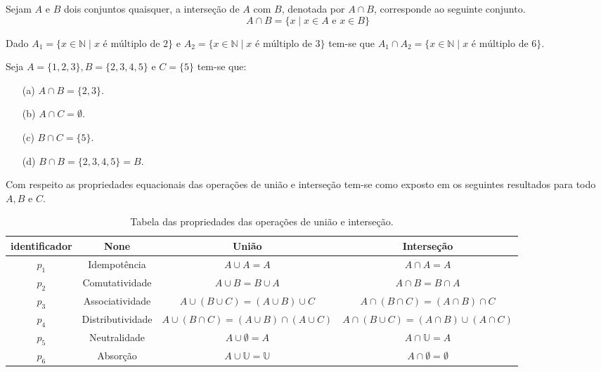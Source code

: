\begin{definition}\label{def:IntersecaoConjuntos}
	Sejam $A$ e $B$ dois conjuntos quaisquer, a interseção de $A$ com $B$, denotada por $A \cap B$, corresponde ao seguinte conjunto.
	$$A \cap B = \{x \mid x \in A \mbox{ e } x \in B\}$$
\end{definition}

\begin{example}\label{exe:IntersecaoDeConuuntos1}
	Dado $A_1 = \{x \in \mathbb{N} \mid x \mbox{ é múltiplo de } 2\}$ e $A_2 = \{x \in \mathbb{N} \mid x \mbox{ é múltiplo de } 3\}$ tem-se que $A_1 \cap A_2 = \{x \in \mathbb{N} \mid x \mbox{ é múltiplo de } 6\}$.
\end{example}

\begin{example}\label{exe:IntersecaoDeConuuntos2}
	Seja $A = \{1, 2, 3\}, B = \{2, 3, 4, 5\}$ e $C = \{5\}$ tem-se que:
	\begin{itemize}
		\item[(a)] $A \cap B = \{2, 3\}$.
		\item[(b)] $A \cap C = \emptyset$.
		\item[(c)] $B \cap C = \{5\}$.
		\item[(d)] $B \cap B = \{2, 3, 4, 5\} = B$.
	\end{itemize}
\end{example}

Com respeito as propriedades equacionais das operações de união e interseção tem-se como exposto em \cite{lipschutz2013-MD} os seguintes resultados para todo $A, B$ e $C$.

\begin{table}[h]
	\centering
	\begin{tabular}{cccc}
		\hline
		identificador & None & União & Interseção  \\
		\hline
		$p_1$ & Idempotência &  $A \cup A = A$ & $A \cap A = A$  \\
		$p_2$ & Comutatividade & $A \cup B = B \cup A$ & $A \cap B = B \cap A$ \\
		$p_3$ & Associatividade & $A \cup (B \cup C) = (A \cup B) \cup C$ & $A \cap (B \cap C) = (A \cap B) \cap C$ \\
		$p_4$ & Distributividade & $A \cup (B \cap C) = (A \cup B) \cap (A \cup C)$ & $A \cap (B \cup C) = (A \cap B) \cup (A \cap C)$\\
		$p_5$ & Neutralidade &  $A \cup \emptyset = A$ & $A \cap \mathbb{U} = A$ \\
		$p_6$ & Absorção & $A \cup \mathbb{U} = \mathbb{U}$ & $A \cap \emptyset = \emptyset$ \\
		\hline
	\end{tabular}
	\caption{Tabela das propriedades das operações de união e interseção.}
	\label{tab:PropriedadesUniaoIntersecao}
\end{table}

